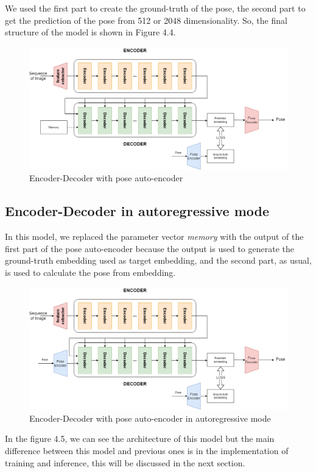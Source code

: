 We used the first part to create the ground-truth of the pose, the second part to get the prediction of the pose from 512 or 2048 dimensionality.
So, the final structure of the model is shown in Figure 4.4.
\begin{figure}[H]
    \centering
    \includegraphics[width=\textwidth]{images/4_encoder_decoder_with_pose_autoencoder}
    \caption{Encoder-Decoder with pose auto-encoder}\label{fig:figure-encoder-decoder-with-pose-encoder}
\end{figure}

\subsection{Encoder-Decoder in autoregressive mode}\label{subsec:encoder-decoder-in-autoregressive-mode}
In this model, we replaced the parameter vector \textit{memory} with the output of the first part of the pose auto-encoder because the output is used to generate the ground-truth embedding used as target embedding, and the second part, as usual, is used to calculate the pose from embedding.

\begin{figure}[H]
    \centering
    \includegraphics[width=\textwidth]{images/4_autoregressive_model}
    \caption{Encoder-Decoder with pose auto-encoder in autoregressive mode}\label{fig:figure-auto-regressive-model}
\end{figure}

In the figure 4.5, we can see the architecture of this model but the main difference between this model and previous ones is in the implementation of training and inference, this will be discussed in the next section.

